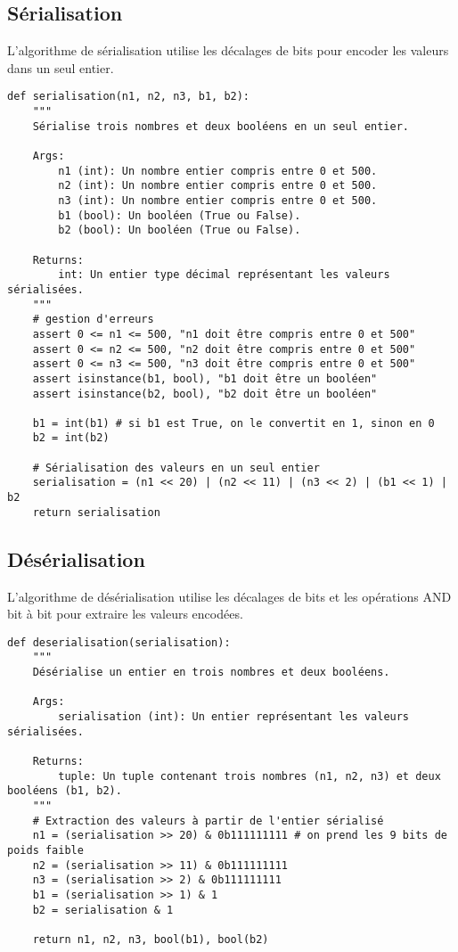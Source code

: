 \documentclass{article}
\begin{document}
\subsection*{Sérialisation}

L'algorithme de sérialisation utilise les décalages de bits pour encoder les valeurs dans un seul entier.

\begin{lstlisting}[caption=Fonction de Sérialisation]
def serialisation(n1, n2, n3, b1, b2):
    """
    Sérialise trois nombres et deux booléens en un seul entier.

    Args:
        n1 (int): Un nombre entier compris entre 0 et 500.
        n2 (int): Un nombre entier compris entre 0 et 500.
        n3 (int): Un nombre entier compris entre 0 et 500.
        b1 (bool): Un booléen (True ou False).
        b2 (bool): Un booléen (True ou False).

    Returns:
        int: Un entier type décimal représentant les valeurs sérialisées.
    """
    # gestion d'erreurs
    assert 0 <= n1 <= 500, "n1 doit être compris entre 0 et 500"
    assert 0 <= n2 <= 500, "n2 doit être compris entre 0 et 500"
    assert 0 <= n3 <= 500, "n3 doit être compris entre 0 et 500"
    assert isinstance(b1, bool), "b1 doit être un booléen"
    assert isinstance(b2, bool), "b2 doit être un booléen"
    
    b1 = int(b1) # si b1 est True, on le convertit en 1, sinon en 0
    b2 = int(b2)
    
    # Sérialisation des valeurs en un seul entier
    serialisation = (n1 << 20) | (n2 << 11) | (n3 << 2) | (b1 << 1) | b2
    return serialisation
\end{lstlisting}

\break\subsection*{Désérialisation}

\small L'algorithme de désérialisation utilise les décalages de bits et les opérations AND bit à bit pour extraire les valeurs encodées.

\begin{lstlisting}[caption=Fonction de Désérialisation]
def deserialisation(serialisation):
    """
    Désérialise un entier en trois nombres et deux booléens.

    Args:
        serialisation (int): Un entier représentant les valeurs sérialisées.

    Returns:
        tuple: Un tuple contenant trois nombres (n1, n2, n3) et deux booléens (b1, b2).
    """
    # Extraction des valeurs à partir de l'entier sérialisé
    n1 = (serialisation >> 20) & 0b111111111 # on prend les 9 bits de poids faible
    n2 = (serialisation >> 11) & 0b111111111
    n3 = (serialisation >> 2) & 0b111111111
    b1 = (serialisation >> 1) & 1
    b2 = serialisation & 1
    
    return n1, n2, n3, bool(b1), bool(b2)
\end{lstlisting}
\end{document}
